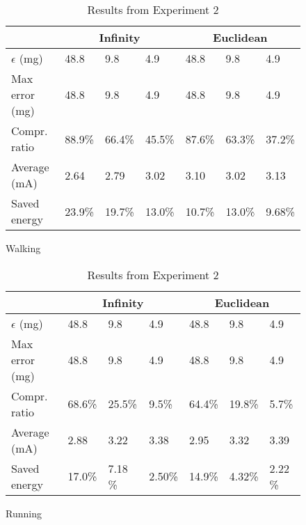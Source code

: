 \documentclass[10pt, conference, compsocconf]{IEEEtran}
\begin{document}
\begin{table}[]
   \begin{subfigure}{\columnwidth}
   \centering
   \begin{tabular}{l|l|l|l|l|l|l}
   \hline
   \rowcolor{headcolor}
                          & \multicolumn{3}{c|}{Infinity} & \multicolumn{3}{c}{Euclidean} \\\hline
   $\epsilon$ (mg)             & 48.8       & 9.8      & 4.9       & 48.8      & 9.8       & 4.9    \\
   Max error (mg)              & 48.8     & 9.8        & 4.9      & 48.8   & 9.8   & 4.9  \\
   Compr.      ratio      & 88.9\%    & 66.4\%  & 45.5\%   & 87.6\%   & 63.3\%   & 37.2\% \\
   Average (mA)                & 2.64     & 2.79   & 3.02   & 3.10    & 3.02    & 3.13  \\
   Saved energy              & 23.9\%    & 19.7\%  & 13.0\%  &  10.7\%   & 13.0\%   & 9.68\%\\
   \hline
   \end{tabular}
   \caption{Walking}
   \end{subfigure}
   \begin{subfigure}{\columnwidth}
   \centering
   \begin{tabular}{l|l|l|l|l|l|l}
   \hline
   \rowcolor{headcolor}

                     & \multicolumn{3}{c|}{Infinity} & \multicolumn{3}{c}{Euclidean} \\\hline
   $\epsilon$ (mg)        & 48.8       & 9.8      & 4.9       & 48.8      & 9.8       & 4.9    \\
   Max error (mg)         & 48.8       & 9.8        & 4.9        & 48.8   &9.8    & 4.9   \\
   Compr.      ratio & 68.6\%    & 25.5\%  & 9.5\%     & 64.4\%   & 19.8\%   & 5.7\%   \\
   Average (mA)        & 2.88     & 3.22   & 3.38     & 2.95    & 3.32    & 3.39   \\
   Saved energy      & 17.0\%    & 7.18 \%   & 2.50\%   & 14.9\%   & 4.32\%   & 2.22 \%\\
   \hline
   \end{tabular}
   \caption{Running}
   \end{subfigure}
   \caption{Results from Experiment 2}
   \label{table:results-energy}
\end{table}

\end{document}
